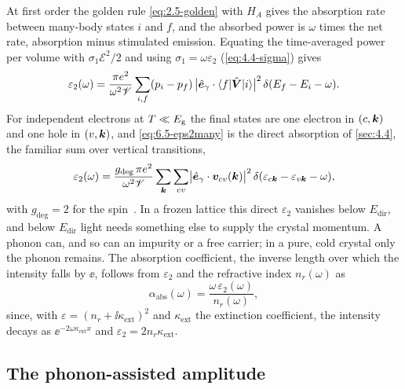 At first order the golden rule \cref{eq:2.5-golden} with $H_A$ gives the absorption rate between many-body states $i$ and $f$, and the absorbed power is $\omega$ times the net rate, absorption minus stimulated emission. Equating the time-averaged power per volume with $\sigma_1\mathcal{E}^2/2$ and using $\sigma_1 = \omega\varepsilon_2$ (\cref{eq:4.4-sigma}) gives
\begin{equation}
  \varepsilon_2(\omega) = \frac{\pi e^2}{\omega^2\mathscr{V}}\sum_{i,f}(p_i - p_f)\,\bigl|\hat{\bm{e}}_\gamma\cdot\langle f|\hat{\bm{V}}|i\rangle\bigr|^2\,\delta(E_f - E_i - \omega) .
  \label{eq:6.5-eps2many}
\end{equation}
For independent electrons at $T \ll E_{\mathrm{g}}$ the final states are one electron in $(c,\bm{k})$ and one hole in $(v,\bm{k})$, and \cref{eq:6.5-eps2many} is the direct absorption of \cref{sec:4.4}, the familiar sum over vertical transitions,
\begin{equation}
  \varepsilon_2(\omega) = \frac{g_{\mathrm{deg}}\,\pi e^2}{\omega^2 \mathscr{V}}\sum_{\bm{k}}\sum_{cv}\bigl|\hat{\bm{e}}_\gamma\cdot\bm{v}_{cv}(\bm{k})\bigr|^2\,\delta(\varepsilon_{c\bm{k}} - \varepsilon_{v\bm{k}} - \omega) ,
  \label{eq:6.5-eps2dir}
\end{equation}
with $g_{\mathrm{deg}} = 2$ for the spin~\cite[Chap.~6]{yu2010fundamentals}. In a frozen lattice this direct $\varepsilon_2$ vanishes below $E_{\mathrm{dir}}$, and below $E_{\mathrm{dir}}$ light needs something else to supply the crystal momentum. A phonon can, and so can an impurity or a free carrier; in a pure, cold crystal only the phonon remains. The absorption coefficient, the inverse length over which the intensity falls by $\ee$, follows from $\varepsilon_2$ and the refractive index $n_r(\omega)$ as
\begin{equation}
  \alpha_{\mathrm{abs}}(\omega) = \frac{\omega\,\varepsilon_2(\omega)}{n_r(\omega)} ,
  \label{eq:6.5-alpha}
\end{equation}
since, with $\varepsilon = (n_r + \ii\kappa_{\mathrm{ext}})^2$ and $\kappa_{\mathrm{ext}}$ the extinction coefficient, the intensity decays as $\ee^{-2\omega\kappa_{\mathrm{ext}}x}$ and $\varepsilon_2 = 2n_r\kappa_{\mathrm{ext}}$.

\subsection{The phonon-assisted amplitude}

